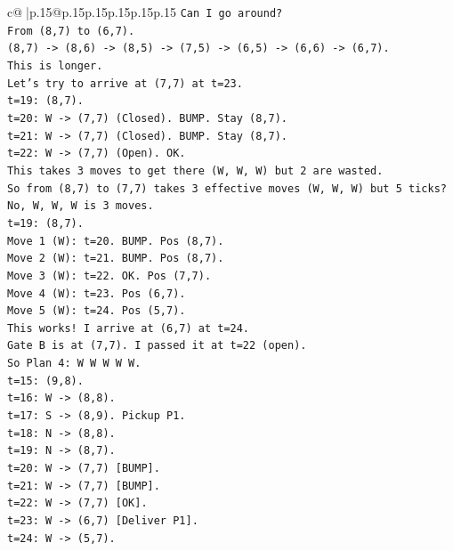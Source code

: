 \documentclass{article}
\begin{document}
{\begin{supertabular}{c@{$\;$}|p{.15\linewidth}@{}p{.15\linewidth}p{.15\linewidth}p{.15\linewidth}p{.15\linewidth}p{.15\linewidth}}
{{{\texttt{Can I go around?} \\
\texttt{From (8,7) to (6,7).} \\
\texttt{(8,7) {-}> (8,6) {-}> (8,5) {-}> (7,5) {-}> (6,5) {-}> (6,6) {-}> (6,7).} \\
\texttt{This is longer.} \\
\texttt{Let's try to arrive at (7,7) at t=23.} \\
\texttt{t=19: (8,7).} \\
\texttt{t=20: W {-}> (7,7) (Closed). BUMP. Stay (8,7).} \\
\texttt{t=21: W {-}> (7,7) (Closed). BUMP. Stay (8,7).} \\
\texttt{t=22: W {-}> (7,7) (Open). OK.} \\
\texttt{This takes 3 moves to get there (W, W, W) but 2 are wasted.} \\
\texttt{So from (8,7) to (7,7) takes 3 effective moves (W, W, W) but 5 ticks?} \\
\texttt{No, W, W, W is 3 moves.} \\
\texttt{t=19: (8,7).} \\
\texttt{Move 1 (W): t=20. BUMP. Pos (8,7).} \\
\texttt{Move 2 (W): t=21. BUMP. Pos (8,7).} \\
\texttt{Move 3 (W): t=22. OK. Pos (7,7).} \\
\texttt{Move 4 (W): t=23. Pos (6,7).} \\
\texttt{Move 5 (W): t=24. Pos (5,7).} \\
\texttt{This works! I arrive at (6,7) at t=24.} \\
\texttt{Gate B is at (7,7). I passed it at t=22 (open).} \\
\texttt{So Plan 4: W W W W W.} \\
\texttt{t=15: (9,8).} \\
\texttt{t=16: W {-}> (8,8).} \\
\texttt{t=17: S {-}> (8,9). Pickup P1.} \\
\texttt{t=18: N {-}> (8,8).} \\
\texttt{t=19: N {-}> (8,7).} \\
\texttt{t=20: W {-}> (7,7) {[}BUMP{]}.} \\
\texttt{t=21: W {-}> (7,7) {[}BUMP{]}.} \\
\texttt{t=22: W {-}> (7,7) {[}OK{]}.} \\
\texttt{t=23: W {-}> (6,7) {[}Deliver P1{]}.} \\
\texttt{t=24: W {-}> (5,7).} \\
}}}
\end{supertabular}}
\end{document}
